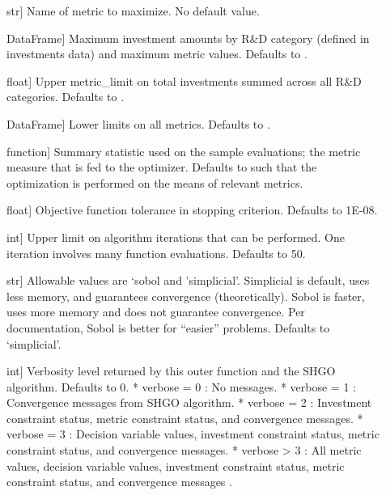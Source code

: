 \documentclass[letterpaper,10pt,english]{sphinxmanual}
\begin{document}
\begin{description}
\item[{}] \leavevmode{[}str{]}
Name of metric to maximize. No default value.

\item[{}] \leavevmode{[}DataFrame{]}
Maximum investment amounts by R\&D category (defined in investments
data) and maximum metric values. Defaults to .

\item[{}] \leavevmode{[}float{]}
Upper metric\_limit on total investments summed across all R\&D
categories. Defaults to .

\item[{}] \leavevmode{[}DataFrame{]}
Lower limits on all metrics. Defaults to .

\item[{}] \leavevmode{[}function{]}
Summary statistic used on the sample evaluations; the metric measure
that is fed to the optimizer. Defaults to  such that the
optimization is performed on the means of relevant metrics.

\item[{}] \leavevmode{[}float{]}
Objective function tolerance in stopping criterion. Defaults to
1E-08.

\item[{}] \leavevmode{[}int{]}
Upper limit on algorithm iterations that can be performed. One
iteration involves many function evaluations. Defaults to 50.

\item[{}] \leavevmode{[}str{]}
Allowable values are ‘sobol and ’simplicial’. Simplicial is default,
uses less memory, and guarantees convergence (theoretically). Sobol
is faster, uses more memory and does not guarantee convergence. Per
documentation, Sobol is better for “easier” problems. Defaults to
‘simplicial’.

\item[{}] \leavevmode{[}int{]}
Verbosity level returned by this outer function and the SHGO algorithm. Defaults to 0.
*  verbose = 0 : No messages.
*  verbose = 1 : Convergence messages from SHGO algorithm.
*  verbose = 2 : Investment constraint status, metric constraint status, and convergence messages.
*  verbose = 3 : Decision variable values, investment constraint status, metric constraint status, and convergence messages.
*  verbose \textgreater{} 3 : All metric values, decision variable values, investment constraint status, metric constraint status, and convergence messages .

\end{description}
\end{document}
